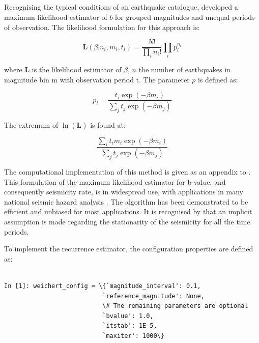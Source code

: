 \subsection{\cite{Weichert1980}}

Recognising the typical conditions of an earthquake catalogue, \cite{Weichert1980} developed a maximum likelihood estimator of $b$ for grouped magnitudes and unequal periods of observation. The likelihood formulation for this approach is:

\begin{equation}
   \mathbf{L} \left( {\beta | n_i, m_i, t_i} \right) = \frac{ N!}{\prod_i n_i!} \prod_i p_{i}^{n_i}
\end{equation}

where $\mathbf{L}$ is the likelihood estimator of $\beta$, $n$ the number of earthquakes in magnitude bin m with observation period t. The parameter $p$ is defined as:

\begin{equation}
   p_i = \frac{t_i \exp \left( {-\beta m_i} \right) }{\sum_j t_j \exp \left( {-\beta m_j} \right)}
\end{equation}

The extremum of $\ln \left( {\mathbf{L}}\right)$ is found at:

\begin{equation} 
   \frac{\sum_i t_i m_i \exp \left( {-\beta m_i} \right)}{\sum_j t_j \exp \left( {-\beta m_j} \right)}
\end{equation}

The computational implementation of this method is given as an appendix to \cite{Weichert1980}. This formulation of the maximum likelihood estimator for b-value, and consequently seismicity rate, is in widespread use, with applications in many national seismic hazard analysis \citep[e.g.]{usgsNSHM1996,usgsNSHM2002}. The algorithm has been demonstrated to be efficient and unbiased for most applications. It is recognised by \citet{Felzer2008} that an implicit assumption is made regarding the stationarity of the seismicity for all the time periods. 

To implement the \cite{Weichert1980} recurrence estimator, the configuration properties are defined as:

\begin{Verbatim}[frame=single, commandchars=\\\{\}, fontsize=\scriptsize]

In [1]: weichert_config = \{`magnitude_interval': 0.1,
                           `reference_magnitude': None,
                           \# The remaining parameters are optional
                           `bvalue': 1.0,
                           `itstab': 1E-5,
                           `maxiter': 1000\}

\end{Verbatim}

